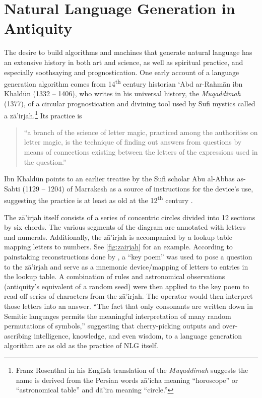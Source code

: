 \section{Natural Language Generation in Antiquity}
 
The desire to build algorithms and machines that generate natural language has
an extensive history in both art and science, as well as spiritual practice,
and especially soothsaying and prognostication.  One early account of a
language generation algorithm comes from 14\textsuperscript{th} century
historian `Abd ar-Rahm\={a}n ibn Khald\={u}n (1332 -- 1406), who writes in his
universal history, the \textit{Muqaddimah} (1377), of a circular
prognostication and divining tool  used by Sufi mystics called a
z\={a}'irjah.\footnote{Franz Rosenthal in his English translation of the
\textit{Muqaddimah} suggests the name is derived from the Persian words
z\={a}'icha meaning ``horoscope'' or  ``astronomical table'' and d\={a}'ira
meaning ``circle.''} Its practice is \begin{quote} ``a branch of the science of
letter magic, practiced among the authorities on letter magic, is the technique
of finding out answers from questions by means of connections existing between
the letters of the expressions used in the question.''\end{quote}

Ibn Khald\={u}n points to an earlier treatise by the Sufi scholar Abu al-Abbas
as-Sabti (1129 -- 1204) of Marrakesh as a source of instructions for the
device's use, suggesting the practice is at least as old at the
12\textsuperscript{th} century \citep{rosenthal1958muqaddimah}.


 
The z\={a}'irjah itself consists of a series of concentric circles divided into
12 sections by six chords. The various segments of the diagram are annotated
with letters and numerals. Additionally, the z\={a}'irjah is accompanied by a
lookup table mapping letters to numbers. See \autoref{fig:zairjah} for an
example. According to painstaking reconstructions done by
\cite{link2010variantology}, a ``key poem'' was used to pose a question to the
z\={a}'irjah and serve as a mnemonic device/mapping of letters to entries in
the lookup table.  A combination of rules and astronomical observations
(antiquity's equivalent of a random seed) were then applied to the key poem to
read off series of characters from the z\={a}'irjah. The operator would then
interpret those letters into an answer.  ``The fact that only consonants are
written down in Semitic languages permits the meaningful interpretation of many
random permutations of symbols,'' \citep{link2010variantology} suggesting that
cherry-picking outputs and over-ascribing intelligence, knowledge, and even
wisdom, to a language generation algorithm are as old as the practice of NLG
itself.
  
